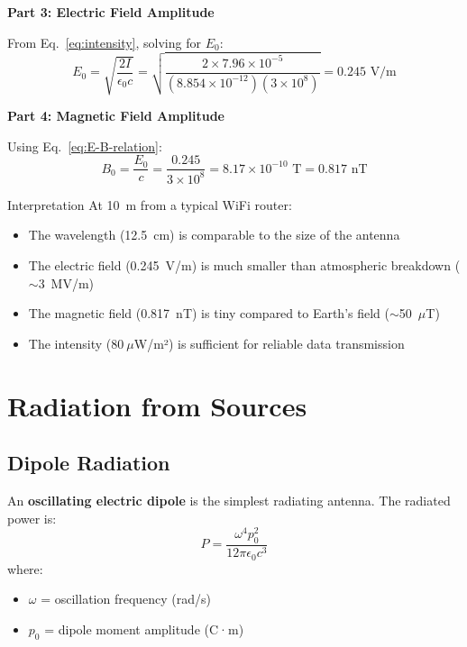 \textbf{Part 3: Electric Field Amplitude}

From Eq.~\ref{eq:intensity}, solving for $E_0$:
\begin{equation}
E_0 = \sqrt{\frac{2I}{\epsilon_0 c}} = \sqrt{\frac{2 \times 7.96 \times 10^{-5}}{(8.854 \times 10^{-12})(3 \times 10^8)}} = 0.245 \text{ V/m}
\end{equation}

\textbf{Part 4: Magnetic Field Amplitude}

Using Eq.~\ref{eq:E-B-relation}:
\begin{equation}
B_0 = \frac{E_0}{c} = \frac{0.245}{3 \times 10^8} = 8.17 \times 10^{-10} \text{ T} = 0.817 \text{ nT}
\end{equation}

\begin{calloutbox}{Interpretation}
At 10~m from a typical WiFi router:
\begin{itemize}
\item The wavelength (12.5~cm) is comparable to the size of the antenna
\item The electric field (0.245~V/m) is much smaller than atmospheric breakdown ($\sim$3~MV/m)
\item The magnetic field (0.817~nT) is tiny compared to Earth's field ($\sim$50~$\mu$T)
\item The intensity ($80~\mu$W/m²) is sufficient for reliable data transmission
\end{itemize}
\end{calloutbox}

\section{Radiation from Sources}

\subsection{Dipole Radiation}

An \textbf{oscillating electric dipole} is the simplest radiating antenna. The radiated power is:
\begin{equation}
P = \frac{\omega^4 p_0^2}{12\pi\epsilon_0 c^3}
\label{eq:dipole-power}
\end{equation}
where:
\begin{itemize}
\item $\omega$ = oscillation frequency (rad/s)
\item $p_0$ = dipole moment amplitude (C·m)
\end{itemize}

